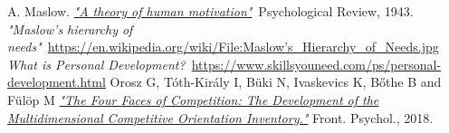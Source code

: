 \documentclass[twoside]{ctuthesis}
\begin{document}
    \maketitle
    
    
    
    
    
    
    

    
    \begin{thebibliography}{99}
         A. Maslow. \href{http://psychclassics.yorku.ca/Maslow/motivation.htm}{\emph{"A theory of human motivation"}}~Psychological Review, 1943.
         \emph{"Maslow's hierarchy of needs"}~\href{https://en.wikipedia.org/wiki/File:Maslow's_Hierarchy_of_Needs.jpg}{https://en.wikipedia.org/wiki/File:Maslow's\_Hierarchy\_of\_Needs.jpg}
         \emph{What is Personal Development?}~\href{https://www.skillsyouneed.com/ps/personal-development.html}{https://www.skillsyouneed.com/ps/personal-development.html}
         Orosz G, Tóth-Király I, Büki N, Ivaskevics K, Bőthe B and Fülöp M \href{https://www.frontiersin.org/articles/10.3389/fpsyg.2018.00779/full}{\emph{"The Four Faces of Competition: The Development of the Multidimensional Competitive Orientation Inventory."}} Front. Psychol., 2018.
    \end{thebibliography}
\end{document}
